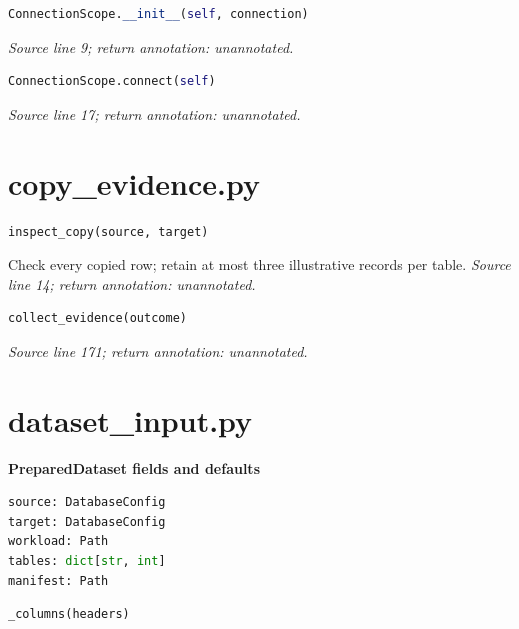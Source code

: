 \begin{lstlisting}[language=Python]
ConnectionScope.__init__(self, connection)
\end{lstlisting}


{\small \textit{Source line 9; return annotation: unannotated.}}



\begin{lstlisting}[language=Python]
ConnectionScope.connect(self)
\end{lstlisting}


{\small \textit{Source line 17; return annotation: unannotated.}}

\section{copy\_evidence.py}




\begin{lstlisting}[language=Python]
inspect_copy(source, target)
\end{lstlisting}


{\small Check every copied row; retain at most three illustrative records per table. \textit{Source line 14; return annotation: unannotated.}}



\begin{lstlisting}[language=Python]
collect_evidence(outcome)
\end{lstlisting}


{\small \textit{Source line 171; return annotation: unannotated.}}

\section{dataset\_input.py}


\textbf{PreparedDataset fields and defaults}


\begin{lstlisting}[language=Python]
source: DatabaseConfig
target: DatabaseConfig
workload: Path
tables: dict[str, int]
manifest: Path
\end{lstlisting}




\begin{lstlisting}[language=Python]
_columns(headers)
\end{lstlisting}


